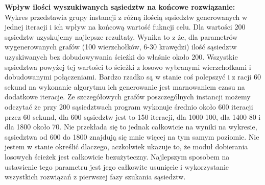 \documentclass{article}
\begin{document}
\large\textbf{Wpływ ilości wyszukiwanych sąsiedztw na końcowe rozwiązanie:}\normalsize\\
Wykres przedstawia grupy instancji z różną ilością sąsiedztw generowanych
w jednej iteracji i ich wpływ na końcową wartość fukncji celu. Dla wartości
200 sąsiedztw uzyskujemy najlepsze rezultaty. Wynika to z że, dla parametrów
wygenerowanych grafów (100 wierzchołków, 6-30 krawędzi) ilość sąsiedztw
uzyskiwanych bez dobudowywania ścieżki do właśnie około 200. Wszystkie
sąsiedztwa powyżej tej wartości to ścieżki z losowo wybranymi wierzchołkami
i dobudowanymi połączeniami. Bardzo rzadko są w stanie coś polepszyć i z racji
60 sekund na wykonanie algorytmu ich generowanie jest marnowaniem czasu
na dodatkowe iteracje. Ze szczegółowych grafów poszczególnych instancji możemy
odczytać że przy 200 sąsiedztwach program wykonuje średnio około 600 iteracji
przez 60 sekund, dla 600 sąsiedztw jest to 150 iteracji, dla 1000 100, dla 1400 80
i dla 1800 około 70. Nie przekłada się to jednak całkowicie na wyniki na wykresie,
sąsiedztwa od 600 do 1800 znajdują się mnie więcej na tym samym poziomie. Nie
jestem w stanie określić dlaczego, aczkolwiek ukazuje to, że moduł dobierania
losowych ścieżek jest całkowicie bezużyteczny. Najlepszym sposobem na
ustawienie tego parametru jest jego całkowite usunięcie i wykorzystanie
wszystkich rozwiązań z pierwszej fazy szukania sąsiedztw.

\begin{center}
\end{center}
\end{document}
